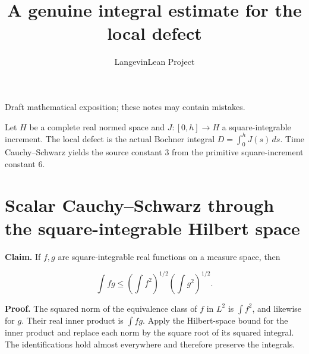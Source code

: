 \documentclass[11pt,a4paper]{article}
\title{\texorpdfstring{A genuine integral estimate for the local defect}{A genuine integral estimate for the local defect}}
\author{LangevinLean Project}
\date{}
\begin{document}
\maketitle
Draft mathematical exposition; these notes may contain mistakes.


Let \(H\) be a complete real normed space and \(J:[0,h]\to H\) a square-integrable increment. The local defect is the actual Bochner integral \(D=\int_0^hJ(s)\,ds\). Time Cauchy–Schwarz yields the source constant \(3\) from the primitive square-increment constant \(6\).


\section{\texorpdfstring{Scalar Cauchy–Schwarz through the square-integrable Hilbert space}{Scalar Cauchy–Schwarz through the square-integrable Hilbert space}}


\textbf{Claim.} If \(f,g\) are square-integrable real functions on a measure space, then

\[\int fg\le\left(\int f^2\right)^{1/2}\left(\int g^2\right)^{1/2}.\]


\textbf{Proof.} The squared norm of the equivalence class of \(f\) in \(L^2\) is \(\int f^2\), and likewise for \(g\). Their real inner product is \(\int fg\). Apply the Hilbert-space bound for the inner product and replace each norm by the square root of its squared integral. The identifications hold almost everywhere and therefore preserve the integrals.
\end{document}

